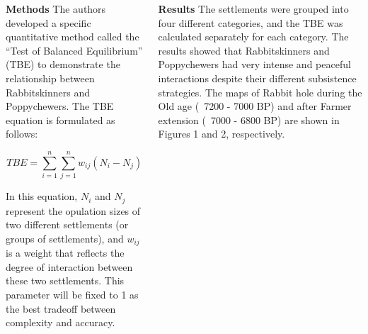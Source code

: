 \documentclass[final]{beamer}
\begin{document}
\begin{frame}[t]
\begin{columns}[t]
    \begin{block}{\textbf{Methods}}
            The authors developed a specific quantitative method called the ``Test of Balanced Equilibrium'' (TBE) to demonstrate the relationship between Rabbitskinners and Poppychewers. The TBE equation is formulated as follows:

            \begin{equation}
                TBE = \sum_{i=1}^{n} \sum_{j=1}^{n} w_{ij} (N_i - N_j)
            \end{equation}

            In this equation, $N_i$ and $N_j$ represent the opulation sizes of two different settlements (or groups of settlements), and $w_{ij}$ is a weight that reflects the degree of interaction between these two settlements. This parameter will be fixed to 1 as the best tradeoff between complexity and accuracy.
        \end{block}

        \begin{block}{\textbf{Results}}
            The settlements were grouped into four different categories, and the TBE was calculated separately for each category. The results showed that Rabbitskinners and Poppychewers had very intense and peaceful interactions despite their different subsistence strategies. The maps of Rabbit hole during the Old age (~7200 - 7000 BP) and after Farmer extension (~7000 - 6800 BP) are shown in Figures 1 and 2, respectively.


\end{block}
\end{columns}
\end{frame}
\end{document}

